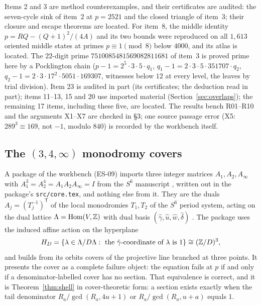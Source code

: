 Items 2 and 3 are method counterexamples, and their certificates are audited: the seven-cycle sink of item~2 at $p=2521$ and the closed triangle of item~3; their closure and escape theorems are located. For item~8, the middle identity $p=RQ-(Q+1)^2/(4A)$ and its two bounds were reproduced on all $1{,}613$ oriented middle states at primes $p\equiv1\pmod8$ below $4000$, and its atlas is located. The $22$-digit prime $7510085481569082811681$ of item~3 is proved prime here by a Pocklington chain ($p-1=2^5\cdot3\cdot5\cdot q_1$, $q_1-1=2\cdot3\cdot5\cdot351707\cdot q_2$, $q_2-1=2\cdot3\cdot17^2\cdot5051\cdot169307$, witnesses below $12$ at every level, the leaves by trial division). Item 23 is audited in part (its certificates; the deduction read in part); items 11--13, 15 and 20 use imported material (Section~\ref{sec:overlaps}); the remaining 17 items, including these five, are located. The results bench R01--R10 and the arguments X1--X7 are checked in  §3; one source passage error (X5: $289^3\equiv169$, not $-1$, modulo $840$) is recorded by the workbench itself.

\subsection{The \texorpdfstring{$(3,4,\infty)$}{(3,4,infinity)} monodromy covers}\label{ssec:es-s6}

A package of the workbench (ES-09) imports three integer matrices $A_1,A_2,A_\infty$ with $A_1^3=A_2^4=A_1A_2A_\infty=I$ from the $S^6$ manuscript \cite{AlpogeS6}, written out in the package's \texttt{src/core.tex}, and nothing else from it. They are the duals $A_j=(T_j^{-1})^{\mathsf T}$ of the local monodromies $T_1,T_2$ of the $S^6$ period system, acting on the dual lattice $\Lambda=\operatorname{Hom}(V,\mathbb{Z})$ with dual basis $(\hat\gamma,\hat u,\hat w,\hat\delta)$ \cite{SixSpherePaper}. The package uses the induced affine action on the hyperplane
\[
H_D=\{\lambda\in\Lambda/D\Lambda:\ \text{the $\hat\gamma$-coordinate of $\lambda$ is }1\}\cong(\mathbb{Z}/D)^3,
\]
and builds from its orbits covers of the projective line branched at three points.
It presents the cover as a complete failure object: the equation fails at $p$ if and only if a denominator-labelled cover has no section. That equivalence is correct, and it is Theorem~\ref{thm:shell} in cover-theoretic form: a section exists exactly when the tail denominator $R_a/\gcd(R_a,4u+1)$ or $R_a/\gcd(R_a,u+a)$ equals $1$.

